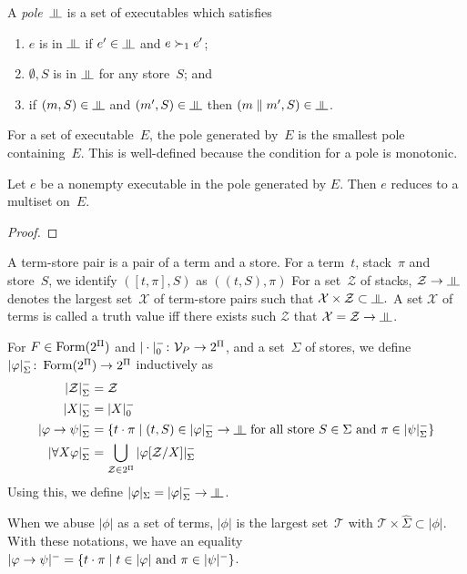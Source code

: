 A \textit{pole}~$\bbot$ is a set of executables
which satisfies
\begin{enumerate}
 \item $e$ is in $\bbot$ if $e'\in\bbot$ and
       $e\succ_1 e'$;
 \item $\emptyset, S$ is in $\bbot$ for any store~$S$; and
 \item if $(m,S)\in\bbot$ and $(m',S)\in\bbot$
       then $(m\conc m',S)\in\bbot$.
\end{enumerate}
For a set of executable~$E$, the pole generated by~$E$ is the smallest
pole containing~$E$.
This is well-defined because the condition for a pole is monotonic.
\begin{proposition}
 Let $e$ be a nonempty executable in the pole generated by $E$.
 Then $e$ reduces to a multiset on~$E$.
\end{proposition}
\begin{proof}
\end{proof}

A term-store pair is a pair of a term and a store.
For a term~$t$, stack~$\pi$ and store~$S$, we identify $([t,\pi], S)$
as $((t,S), \pi)$
For a set~$\mathcal Z$ of stacks, $\mathcal Z\imp\bbot$ denotes
the largest set~$\mathcal X$ of term-store pairs such that
$\mathcal X\times\mathcal Z\subset \bbot.$
A set $\mathcal X$ of terms is called a truth value
iff there exists
such $\mathcal Z$ that $\mathcal X = \mathcal Z\imp \bbot$.

\renewcommand{\sem}[1]{|{#1}|}
\newcommand{\nsem}[1]{\sem{#1}^-}
For $F\in\mathop{\text{Form}}(2^\Pi)$ and $|\cdot|^-_0\colon\mathcal V_P\rightarrow 2^\Pi$,
and a set~$\Sigma$ of stores,
we define $\nsem{\phi}_\Sigma\colon \form(2^\Pi)\rightarrow
2^\Pi$ inductively as
\begin{align*}
 \nsem{\mathcal Z}_\Sigma &= \mathcal Z \\
 \nsem{X}_\Sigma&= |X|_0^- \\
 \nsem{\phi\imp\psi}_\Sigma&=
 \{t\cdot\pi\mid(t,S)\in\nsem\phi_\Sigma\rightarrow\bbot\text{ for all store
 }S\in \Sigma\text{ and }\pi\in\nsem\psi_\Sigma\}
 \\
 \nsem{\forall X\phi}_\Sigma&=
 \bigcup_{\mathcal Z\in 2^\Pi} \nsem{\phi[\mathcal Z/X]}_\Sigma
\end{align*}
Using this, we define $\sem \phi_\Sigma=\nsem{\phi}_\Sigma\rightarrow\bbot$.

When we abuse $\sem{\phi}$ as a set of terms,
$\sem{\phi}$ is the largest set~$\mathcal T$
with $\mathcal T\times\hat\Sigma\subset\sem{\phi}$.
With these notations, we have an equality
$\nsem{\phi\imp\psi} = \{t\cdot\pi\mid
t\in\sem\phi\text{ and }\pi\in\nsem\psi\}$.

